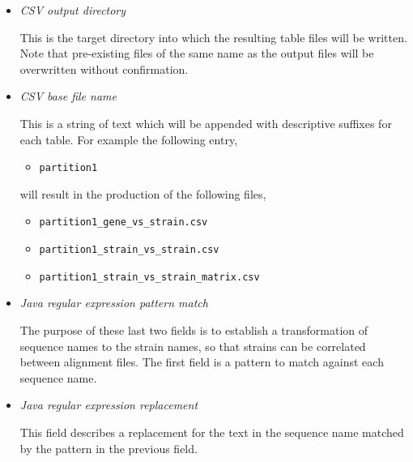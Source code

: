 \documentclass[12pt,letterpaper]{article}
\begin{document}
\begin{itemize}
\item \textit{CSV output directory} \hfill \\
    This is the target directory into which the resulting table files will be
    written.  Note that pre-existing files of the same name as the output files
    will be overwritten without confirmation.

\item \textit{CSV base file name} \hfill \\
    This is a string of text which will be appended with descriptive suffixes
    for each table.  For example the following entry,
    
    \begin{itemize}
    \item[]\texttt{partition1}
    \end{itemize}

    will result in the production of the following files,

    \begin{itemize}
    \item[]\texttt{partition1\_gene\_vs\_strain.csv}
    \item[]\texttt{partition1\_strain\_vs\_strain.csv}
    \item[]\texttt{partition1\_strain\_vs\_strain\_matrix.csv}
    \end{itemize}

\item \textit{Java regular expression pattern match} \hfill \\
    The purpose of these last two fields is to establish a transformation of
    sequence names to the strain names, so that strains can be correlated
    between alignment files.  The first field is a pattern to match against
    each sequence name.

\item \textit{Java regular expression replacement} \hfill \\
    This field describes a replacement for the text in the sequence name
    matched by the pattern in the previous field.

\end{itemize}
\end{document}
